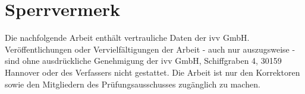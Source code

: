 \section*{Sperrvermerk}
Die nachfolgende Arbeit enthält vertrauliche Daten der \acs{ivv} GmbH. Veröffentlichungen oder
Vervielfältigungen der Arbeit - auch nur auszugsweise - sind ohne ausdrückliche Genehmigung der
\acs{ivv} GmbH, Schiffgraben 4, 30159 Hannover oder des Verfassers nicht gestattet. Die Arbeit ist
nur den Korrektoren sowie den Mitgliedern des Prüfungsausschusses zugänglich zu machen.